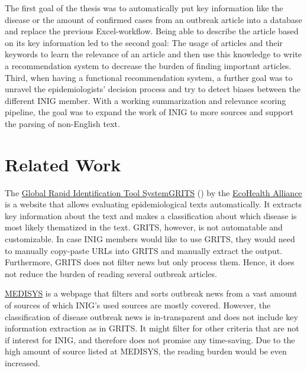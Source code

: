   The first goal of the thesis was to automatically put key information like the disease or the amount of confirmed cases from an outbreak article into a database and replace the previous Excel-workflow. Being able to describe the article based on its key information led to the second goal: The usage of articles and their keywords to learn the relevance of an article and then use this knowledge to write a recommendation system to decrease the burden of finding important articles.
  Third, when having a functional recommendation system, a further goal was to unravel the epidemiologists' decision process and try to detect biases between the different INIG member.
  With a working summarization and relevance scoring pipeline, the goal was to expand the work of INIG to more sources and support the parsing of non-English text.


\section{Related Work}
  The \href{https://grits.eha.io}{Global Rapid Identification Tool SystemGRITS} () by the \href{https://www.ecohealthalliance.org}{EcoHealth Alliance} is a website that allows evaluating epidemiological texts automatically.
  It extracts key information about the text and makes a classification about which disease is most likely thematized in the text.
  GRITS, however, is not automatable and customizable.
  In case INIG members would like to use GRITS, they would need to manually copy-paste URLs into GRITS and manually extract the output.
  Furthermore, GRITS does not filter news but only process them.
  Hence, it does not reduce the burden of reading several outbreak articles.

  \href{http://medisys.newsbrief.eu}{MEDISYS} is a webpage that filters and sorts outbreak news from a vast amount of sources of which INIG's used sources are mostly covered.
  However, the classification of disease outbreak news is in-transparent and does not include key information extraction as in GRITS.
  It might filter for other criteria that are not if interest for INIG, and therefore does not promise any time-saving.
  Due to the high amount of source listed at MEDISYS, the reading burden would be even increased.
